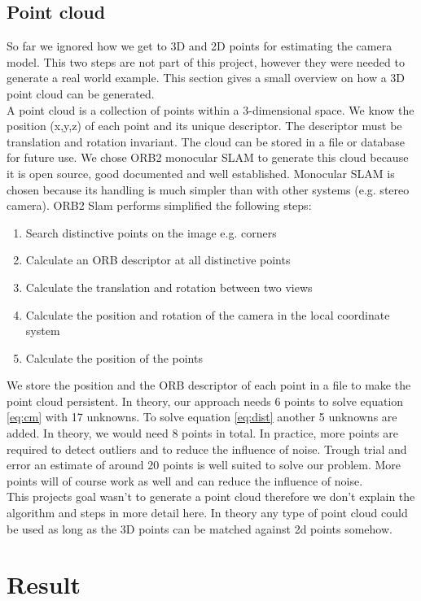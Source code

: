 \documentclass[11pt,a4paper,titlepage,oneside]{report}
\begin{document}
\section{Point cloud}
So far we ignored how we get to 3D and 2D points for estimating the camera model. This two steps are not part of this project, however they were needed to generate a real world example. This section gives a small overview on how a 3D point cloud can be generated.\\
A point cloud is a collection of points within a 3-dimensional space. We know the position (x,y,z) of each point and its unique descriptor. The descriptor must be translation and rotation invariant. The cloud can be stored in a file or database for future use. We chose ORB2 monocular SLAM \cite{orbslam2} to generate this cloud because it is open source, good documented and well established. Monocular SLAM is chosen because its handling is much simpler than with other systems (e.g. stereo camera). ORB2 Slam performs simplified the following steps:
\begin{enumerate}
\item Search distinctive points on the image e.g. corners
\item Calculate an ORB descriptor at all distinctive points
\item Calculate the translation and rotation between two views
\item Calculate the position and rotation of the camera in the local coordinate system
\item Calculate the position of the points
\end{enumerate}
We store the position and the ORB descriptor of each point in a file to make the point cloud persistent.
In theory, our approach needs 6 points to solve equation \ref{eq:cm} with 17 unknowns. To solve equation \ref{eq:dist} another 5 unknowns are added. In theory, we would need 8 points in total. In practice, more points are required to detect outliers and to reduce the influence of noise. Trough trial and error an estimate of around 20 points is well suited to solve our problem. More points will of course work as well and can reduce the influence of noise.\\
This projects goal wasn't to generate a point cloud therefore we don't explain the algorithm and steps in more detail here. In theory any type of point cloud could be used as long as the 3D points can be matched against 2d points somehow.

\chapter{Result}
\end{document}
